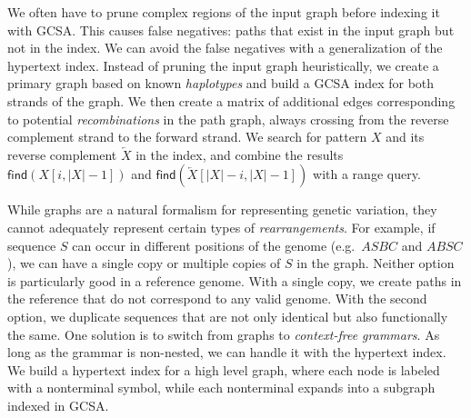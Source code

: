 \documentclass[a4paper,UKenglish]{lipics-v2016}
\newcommand{\abs}[1]{\ensuremath{\lvert #1 \rvert}}
\newcommand{\revcomp}[1]{\ensuremath{\overleftarrow{#1}}}
\newcommand{\find}{\ensuremath{\mathsf{find}}}
\begin{document}
We often have to prune complex regions of the input graph before indexing it with GCSA. This causes false negatives: paths that exist in the input graph but not in the index. We can avoid the false negatives with a generalization of the hypertext index. Instead of pruning the input graph heuristically, we create a primary graph based on known \emph{haplotypes} and build a GCSA index for both strands of the graph. We then create a matrix of additional edges corresponding to potential \emph{recombinations} in the path graph, always crossing from the reverse complement strand to the forward strand. We search for pattern $X$ and its reverse complement $\revcomp{X}$ in the index, and combine the results $\find(X[i, \abs{X}-1])$ and $\find(\revcomp{X}[\abs{X}-i, \abs{X}-1])$ with a range query.

While graphs are a natural formalism for representing genetic variation, they cannot adequately represent certain types of \emph{rearrangements}. For example, if sequence $S$ can occur in different positions of the genome (e.g.~$ASBC$ and $ABSC$), we can have a single copy or multiple copies of $S$ in the graph. Neither option is particularly good in a reference genome. With a single copy, we create paths in the reference that do not correspond to any valid genome. With the second option, we duplicate sequences that are not only identical but also functionally the same. One solution is to switch from graphs to \emph{context-free grammars}. As long as the grammar is non-nested, we can handle it with the hypertext index. We build a hypertext index for a high level graph, where each node is labeled with a nonterminal symbol, while each nonterminal expands into a subgraph indexed in GCSA.
\end{document}

